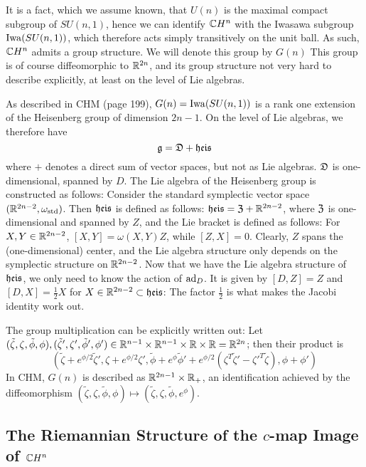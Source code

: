 \documentclass[parskip=half]{scrartcl}
\begin{document}
It is a fact, which we assume known, that $U(n)$ is the maximal compact subgroup of $SU(n,1)$, hence we can identify $\mathbb{C} H^n$ with the Iwasawa subgroup $\operatorname{Iwa}(SU(n,1))$, which therefore acts simply transitively on the unit ball. As such, $\mathbb{C} H^n$ admits a group structure. We will denote this group by $G(n)$ This group is of course diffeomorphic to $\mathbb{R}^{2n}$, and its group structure not very hard to describe explicitly, at least on the level of Lie algebras.

As described in CHM (page 199), $G(n)=\operatorname{Iwa}(SU(n,1))$ is a rank one extension of the Heisenberg group of dimension $2n-1$. On the level of Lie algebras, we therefore have
\begin{equation*}
	\mathfrak{g}=\mathfrak{D}+\mathfrak{heis}
\end{equation*}
where $+$ denotes a direct sum of vector spaces, but not as Lie algebras. $\mathfrak{D}$ is one-dimensional, spanned by $D$. The Lie algebra of the Heisenberg group is constructed as follows: Consider the standard symplectic vector space $(\mathbb{R}^{2n-2},\omega_\text{std})$. Then $\mathfrak{heis}$ is defined as follows: $\mathfrak{heis}=\mathfrak{Z}+\mathbb{R}^{2n-2}$, where $\mathfrak{Z}$ is one-dimensional and spanned by $Z$, and the Lie bracket is defined as follows: For $X,Y\in \mathbb{R}^{2n-2}$, $[X,Y]=\omega(X,Y)Z$, while $[Z,X]=0$. Clearly, $Z$ spans the (one-dimensional) center, and the Lie algebra structure only depends on the symplectic structure on $\mathbb{R}^{2n-2}$. Now that we have the Lie algebra structure of $\mathfrak{heis}$, we only need to know the action of $\operatorname{ad}_D$. It is given by $[D,Z]=Z$ and $[D,X]=\frac{1}{2}X$ for $X\in \mathbb{R}^{2n-2}\subset \mathfrak{heis}$: The factor $\frac{1}{2}$ is what makes the Jacobi identity work out. 

The group multiplication can be explicitly written out: Let $(\tilde\zeta,\zeta,\tilde\phi,\phi),(\tilde\zeta',\zeta',\tilde\phi',\phi')\in \mathbb{R}^{n-1}\times \mathbb{R}^{n-1}\times\mathbb{R}\times \mathbb{R}=\mathbb{R}^{2n}$; then their product is
\begin{equation*}
	(\tilde\zeta+e^{\phi/2}\tilde\zeta',\zeta+e^{\phi/2}\zeta',\tilde\phi+e^{\phi}\tilde\phi'+e^{\phi/2}(\zeta^T\tilde\zeta'-\zeta'^T\tilde\zeta),\phi+\phi')
\end{equation*}
In CHM, $G(n)$ is described as $\mathbb{R}^{2n-1}\times \mathbb{R}_+$, an identification achieved by the diffeomorphism $(\tilde\zeta,\zeta,\tilde\phi,\phi)\mapsto (\tilde\zeta,\zeta,\tilde\phi,e^\phi)$.

\subsection{The Riemannian Structure of the \texorpdfstring{$c$}{c}-map Image of \texorpdfstring{$\mathbb{C} H^n$}{Complex Hyperbolic Space}}
\end{document}
